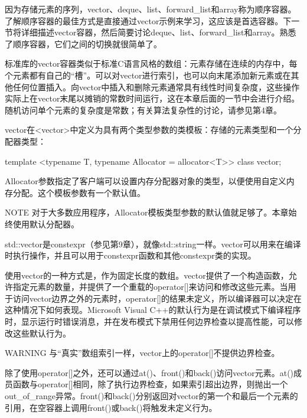 
因为存储元素的序列，vector、deque、list、forward\_list和array称为顺序容器。了解顺序容器的最佳方式是直接通过vector示例来学习，这应该是首选容器。下一节将详细描述vector容器，然后简要讨论deque、list、forward\_list和array。熟悉了顺序容器，它们之间的切换就很简单了。


标准库的vector容器类似于标准C语言风格的数组：元素存储在连续的内存中，每个元素都有自己的“槽”。可以对vector进行索引，也可以向末尾添加新元素或在其他任何位置插入。向vector中插入和删除元素通常具有线性时间复杂度，这些操作实际上在vector末尾以摊销的常数时间运行，这在本章后面的一节中会进行介绍。随机访问单个元素的复杂度是常数；有关算法复杂性的讨论，请参见第4章。


vector在<vector>中定义为具有两个类型参数的类模板：存储的元素类型和一个分配器类型：

\begin{cpp}
template <typename T, typename Allocator = allocator<T>> class vector;
\end{cpp}

Allocator参数指定了客户端可以设置内存分配器对象的类型，以便使用自定义内存分配。这个模板参数有一个默认值。

\begin{myNotic}{NOTE}
对于大多数应用程序，Allocator模板类型参数的默认值就足够了。本章始终使用默认分配器。
\end{myNotic}

std::vector是constexpr（参见第9章），就像std::string一样。vector可以用来在编译时执行操作，并且可以用于constexpr函数和其他constexpr类的实现。


使用vector的一种方式是，作为固定长度的数组。vector提供了一个构造函数，允许指定元素的数量，并提供了一个重载的operator[]来访问和修改这些元素。当用于访问vector边界之外的元素时，operator[]的结果未定义，所以编译器可以决定在这种情况下如何表现。Microsoft Visual C++的默认行为是在调试模式下编译程序时，显示运行时错误消息，并在发布模式下禁用任何边界检查以提高性能，可以修改这些默认行为。

\begin{myWarning}{WARNING}
与“真实”数组索引一样，vector上的operator[]不提供边界检查。
\end{myWarning}

除了使用operator[]之外，还可以通过at()、front()和back()访问vector元素。at()成员函数与operator[]相同，除了执行边界检查，如果索引超出边界，则抛出一个out\_of\_range异常。front()和back()分别返回对vector的第一个和最后一个元素的引用，在空容器上调用front()或back()将触发未定义行为。

